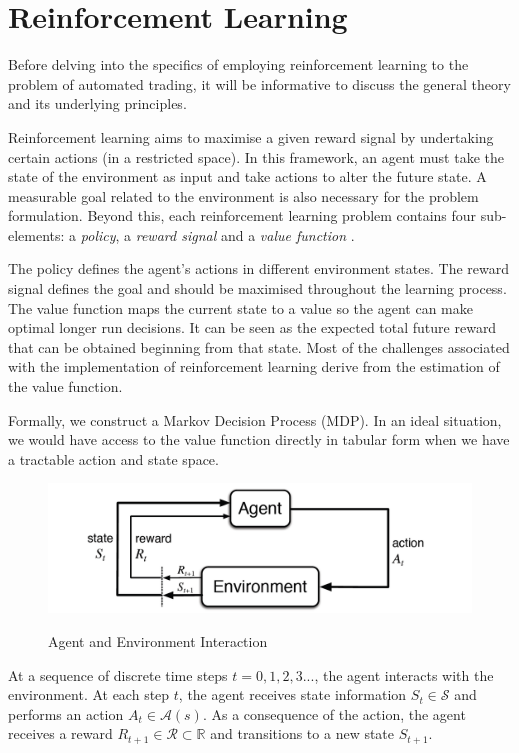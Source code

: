 \documentclass[12pt, authoryear]{elsarticle}
\begin{document}
\section{Reinforcement Learning}
Before delving into the specifics of employing reinforcement learning to the problem of automated trading, it will be informative to discuss the general theory and its underlying principles. 

Reinforcement learning aims to maximise a given reward signal by undertaking certain actions (in a restricted space). In this framework, an agent must take the state of the environment as input and take actions to alter the future state. A measurable goal related to the environment is also necessary for the problem formulation. Beyond this, each reinforcement learning problem contains four sub-elements: a \textit{policy}, a \textit{reward signal} and a \textit{value function} \citep{sutton1998introduction}.

The policy defines the agent's actions in different environment states. The reward signal defines the goal and should be maximised throughout the learning process. The value function maps the current state to a value so the agent can make optimal longer run decisions. It can be seen as the expected total future reward that can be obtained beginning from that state. Most of the challenges associated with the implementation of reinforcement learning derive from the estimation of the value function.

Formally, we construct a Markov Decision Process (MDP).
In an ideal situation, we would have access to the value function directly in tabular form when we have a tractable action and state space.

\begin{figure}[h!]
\centering
\caption{Agent and Environment Interaction}
\includegraphics[clip, angle=0, width=12cm]{figures/Loop.png}
\label{fig:1}
\end{figure}

At a sequence of discrete time steps $t = 0,1,2,3...$, the agent interacts with the environment. At each step $t$, the agent receives state information $S _ { t } \in \mathcal{S}$ and performs an action $A _ { t } \in \mathcal { A } ( s )$. As a consequence of the action, the agent receives a reward $R _ { t + 1 } \in \mathcal { R } \subset \mathbb { R }$ and transitions to a new state $S _ { t + 1 }$.
\end{document}

